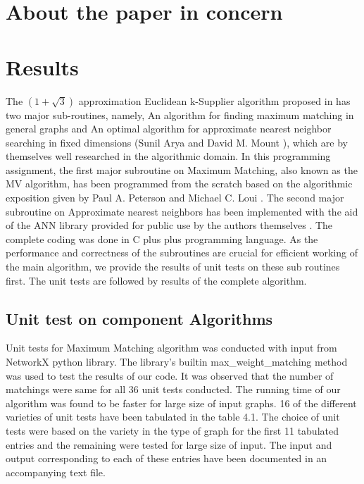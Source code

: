 \documentclass[12pt, a4paper]{article}
\begin{document}
\section{About the paper in concern}

\section{Results}
The $(1+\sqrt{3})$ approximation Euclidean k-Supplier algorithm proposed in \cite{EuclideanKS} has two major sub-routines, namely, An algorithm for ﬁnding maximum matching in general graphs \cite{MicaliVazirani} and An optimal algorithm for approximate nearest neighbor searching in ﬁxed dimensions  (Sunil Arya and David M. Mount \cite{ANN}), which are by themselves well researched in the algorithmic domain. In this programming assignment, the first major subroutine on Maximum Matching, also known as the MV algorithm, has been programmed from the scratch based on the algorithmic exposition given by Paul A. Peterson and Michael C. Loui \cite{Exposition}. The second major subroutine on Approximate nearest neighbors has been implemented with the aid of the ANN library provided for public use by the authors themselves \cite{ANNLibrary}. The complete coding was done in C plus plus programming language. As the performance and correctness of the subroutines are crucial for efficient working of the main algorithm, we provide the results of unit tests on these sub routines first. The unit tests are followed by results of the complete algorithm.\\
\subsection{Unit test on component Algorithms}
Unit tests for Maximum Matching algorithm was conducted with input from NetworkX python library. The library's builtin max\_weight\_matching method was used to test the results of our code. It was observed that the number of matchings were same for all 36 unit tests conducted. The running time of our algorithm was found to be faster for large size of input graphs. 16 of the different varieties of unit tests have been tabulated in the table 4.1. The choice of unit tests were based on the variety in the type of graph for the first 11 tabulated entries and the remaining were tested for large size of input. The input and output corresponding to each of these entries have been documented in an accompanying text file.
\end{document}
